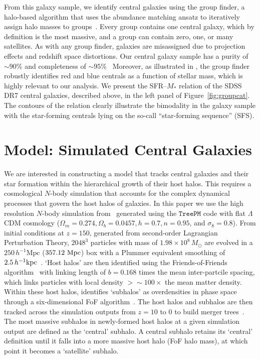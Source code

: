 \documentclass[12pt, letterpaper, preprint, tighten]{aastex62}
\newcommand{\edt}[1]{{\color{dred}{\bf} #1}}
\begin{document}
From this galaxy sample, we identify central galaxies using the
\cite{tinker2011} group finder, a halo-based algorithm that uses
the abundance matching ansatz to iteratively assign halo masses to
groups~\citep[see also][]{yang2005}. Every group contains one
central galaxy, which by definition is the most massive, and a group can
contain zero, one, or many satellites. As with any group finder, galaxies are misassigned due to projection
effects and redshift space distortions. Our central galaxy sample has
a purity of ${\sim}90\%$ and completeness of ${\sim}95\%$~\citep{tinker2018}
Moreover, as illustrated in \cite{campbell2015}, the \cite{tinker2011} group
finder robustly identifies red and blue centrals as a function of stellar mass,
which is highly relevant to our analysis.
We present the SFR--$M_*$ relation of the SDSS DR7 central galaxies, described
above, in the left panel of Figure~\ref{fig:groupcat}. The contours of the
relation clearly illustrate the bimodality in the galaxy sample with the
star-forming centrals lying on the so-call ``star-forming sequence'' (SFS).

\section{Model: Simulated Central Galaxies} \label{sec:sim}
We are interested in constructing a model that tracks central galaxies and
their star formation within the hierarchical growth of their host halos. This
requires a cosmological $N$-body simulation that accounts for the complex
dynamical processes that govern the host halos of galaxies. In this paper
we use the high resolution $N$-body simulation from~\cite{wetzel2013} generated
using the \cite{white2002} $\mathtt{TreePM}$ code with flat $\Lambda$CDM cosmology
($\Omega_m =0.274, \Omega_b = 0.0457, h = 0.7, n=0.95$, and $\sigma_8 = 0.8$).
From initial conditions at $z = 150$, generated from second-order Lagrangian
Perturbation Theory, $2048^3$ particles with mass of $1.98 \times 10^8\,M_\odot$ are
evolved in a $250\,h^{-1}\mathrm{Mpc}$ ($357.12~{\rm Mpc}$) box with a Plummer 
equivalent smoothing of $2.5\,h^{-1}{\rm kpc}$~\citep{wetzel2013, wetzel2014}. 
`Host halos' are then identified using the Friends-of-Friends algorithm~\citep[FoF;][]{davis1985} with
linking length of $b{=}0.168$ times the mean inter-partcile spacing,
\edt{which links particles with local density $>\sim100\times$ the mean matter density.}
Within these host halos, \cite{wetzel2013} identifies `subhalos' as overdensities
in phase space through a six-dimensional FoF algorithm~\citep[FoF6D;][]{white2010}.
The host halos and subhalos are then tracked across the simulation outputs
from $z = 10$ to $0$ to build merger trees~\citep{wetzel2009,wetzel2010}.
The most massive subhalos in newly-formed host halos at a given simulation
output are defined as the `central' subhalo. A central subhalo retains its
`central' definition until it falls into a more massive host halo
(FoF halo mass), at which point it becomes a `satellite' subhalo.
\end{document}
